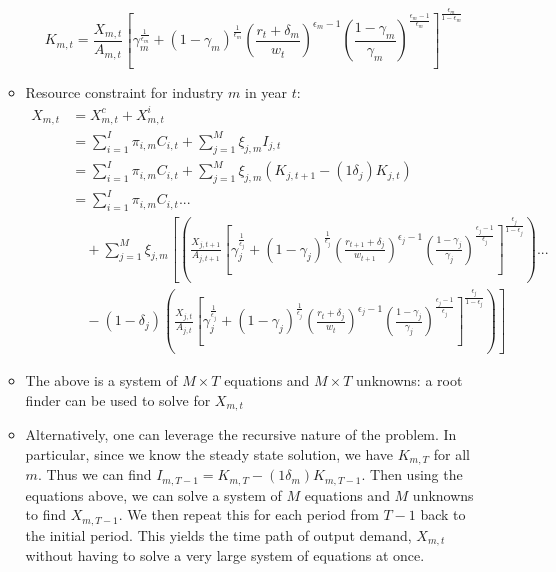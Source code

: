 \documentclass[letterpaper,12pt]{article}
\theoremstyle{definition}
\begin{document}
\begin{spacing}{1.5}
\begin{enumerate}
\begin{itemize}
	\begin{equation}
	\label{eqn:k_demand2}
	K_{m,t} = \frac{X_{m,t}}{A_{m,t}}\left[\gamma_{m}^{\frac{1}{\epsilon_{m}}}+(1-\gamma_{m})^{\frac{1}{\epsilon_{m}}}\left(\frac{r_{t}+\delta_{m}}{w_{t}}\right)^{\epsilon_{m}-1}\left(\frac{1-\gamma_{m}}{\gamma_{m}}	\right)^{\frac{\epsilon_{m}-1}{\epsilon_{m}}}\right]^{\frac{\epsilon_{m}}{1-\epsilon_{m}}}
	\end{equation}
	
	\item Resource constraint for industry $m$ in year $t$: 
	\begin{equation}
	\begin{split}
	X_{m,t} &= X^{c}_{m,t} + X^{i}_{m,t} \\
	&= \sum_{i=1}^{I} \pi_{i,m}C_{i,t} +\sum_{j=1}^{M} \xi_{j,m}I_{j,t} \\
	 &= \sum_{i=1}^{I} \pi_{i,m}C_{i,t} +\sum_{j=1}^{M} \xi_{j,m}\left(K_{j,t+1} - (1\delta_{j})K_{j,t} \right)  \\
	 &= \sum_{i=1}^{I} \pi_{i,m}C_{i,t} ... \\
	 & \quad +\sum_{j=1}^{M} \xi_{j,m}\left[\left( \frac{X_{j,t+1}}{A_{j,t+1}}\left[\gamma_{j}^{\frac{1}{\epsilon_{j}}}+(1-\gamma_{j})^{\frac{1}{\epsilon_{j}}}\left(\frac{r_{t+1}+\delta_{j}}{w_{t+1}}\right)^{\epsilon_{j}-1}\left(\frac{1-\gamma_{j}}{\gamma_{j}}\right)^{\frac{\epsilon_{j}-1}{\epsilon_{j}}}\right]^{\frac{\epsilon_{j}}{1-\epsilon_{j}}}\right) ... \right. \\
	 & \left. \quad - (1-\delta_{j})\left( \frac{X_{j,t}}{A_{j,t}}\left[\gamma_{j}^{\frac{1}{\epsilon_{j}}}+(1-\gamma_{j})^{\frac{1}{\epsilon_{j}}}\left(\frac{r_{t}+\delta_{j}}{w_{t}}\right)^{\epsilon_{j}-1}\left(\frac{1-\gamma_{j}}{\gamma_{j}}	\right)^{\frac{\epsilon_{j}-1}{\epsilon_{j}}}\right]^{\frac{\epsilon_{j}}{1-\epsilon_{j}}}\right) \right]
	\end{split}
	\end{equation}
	
	\item The above is a system of $M\times T$ equations and $M\times T$ unknowns: a root finder can be used to solve for $X_{m,t}$
	\item Alternatively, one can leverage the recursive nature of the problem.  In particular, since we know the steady state solution, we have $K_{m,T}$ for all $m$.  Thus we can find $I_{m,T-1} = K_{m,T} - (1\delta_{m})K_{m,T-1}$.  Then using the equations above, we can solve a system of $M$ equations and $M$ unknowns to find $X_{m,T-1}$.  We then repeat this for each period from $T-1$ back to the initial period.  This yields the time path of output demand, $X_{m,t}$ without having to solve a very large system of equations at once.
	\end{itemize}


\end{enumerate}
\end{spacing}
\end{document}
